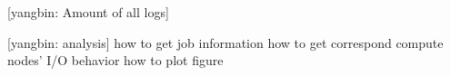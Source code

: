 \documentclass{article}
\begin{document}
[yangbin: Amount of all logs]                                                                                                                                                                                                                                                                                                                                                                                                                                                                                                                                                                                                                                                                                                                                                                                                                                                                                                                                                                                                                                                                                                                                                                                            

[yangbin: analysis]
how to get job information
how to get correspond compute nodes' I/O behavior
how to plot figure




\ifx\allfiles\undefined
\end{document}
